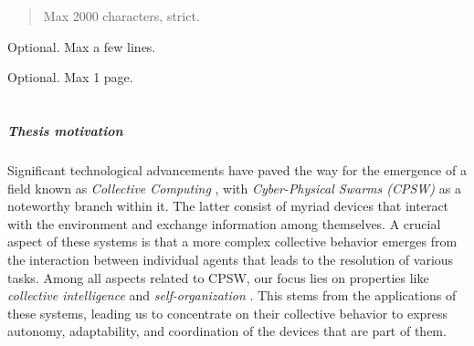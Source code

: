 \documentclass[12pt,a4paper,openright,twoside]{book}
\begin{document}
	
\frontmatter



\begin{abstract}	
Max 2000 characters, strict.
\end{abstract}

\begin{dedication} 
Optional. Max a few lines.
\end{dedication}

\begin{acknowledgements}
Optional. Max 1 page.
\end{acknowledgements}

\tableofcontents   
\listoffigures     
\lstlistoflistings 

\mainmatter

\chapter{\introductionname}
\label{chap:introduction}


\paragraph{Thesis motivation}

Significant technological advancements have paved the way for the emergence of a field known as \emph{Collective Computing} 
    \cite{abowd2016beyond}, with \emph{Cyber-Physical Swarms (CPSW)} \cite{schranz2021swarm} as a noteworthy branch within it.
    The latter consist of myriad devices that interact with the environment and exchange information among themselves. 
    A crucial aspect of these systems is that a more complex collective behavior emerges from the interaction between 
    individual agents that leads to the resolution of various tasks.
    Among all aspects related to CPSW, our focus lies on properties like \emph{collective intelligence} \cite{tumer2004survey} 
    and \emph{self-organization} \cite{schmeck2011organic}. This stems from the applications of these systems, leading us to 
    concentrate on their collective behavior to express autonomy, adaptability, and coordination of the devices 
    that are part of them.
\end{document}
